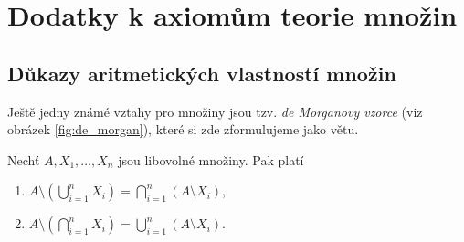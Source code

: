 \chapter{Dodatky k axiomům teorie množin}\label{chap:dodatky_k_axiomum_tm}
\section{Důkazy aritmetických vlastností množin}
Ještě jedny známé vztahy pro množiny jsou tzv. \emph{de Morganovy vzorce} (viz obrázek \ref{fig:de_morgan}), které si zde zformulujeme jako větu.
\begin{theorem}
    Nechť $A,X_1,\dots,X_n$ jsou libovolné množiny. Pak platí
    \begin{enumerate}[label=(\roman*)]
        \item\label{item:de_morgan_1} $\displaystyle A \setminus \left(\bigcup\limits_{i=1}^{n}{X_i}\right)=\bigcap\limits_{i=1}^{n}{(A \setminus X_i)}$,
        \item\label{item:de_morgan_2} $\displaystyle A \setminus \left(\bigcap\limits_{i=1}^{n}{X_i}\right)=\bigcup\limits_{i=1}^{n}{(A \setminus X_i)}$.
    \end{enumerate}
\end{theorem}

